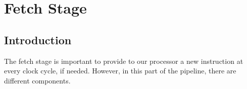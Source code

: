 \chapter{Fetch Stage}
\label{chap_ft}

\section{Introduction}
The fetch stage is important to provide to our processor a new instruction at every clock cycle, if needed. However, in this part of the pipeline, there are different components.